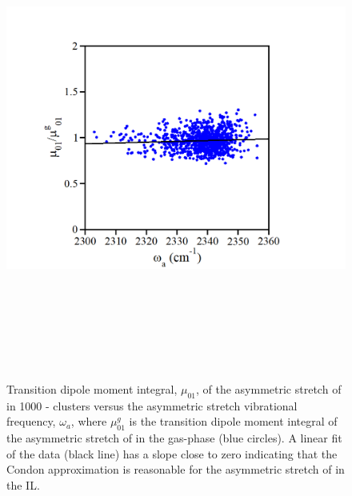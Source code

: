\documentclass[]{article}
\begin{document}
\begin{figure}
  \centering
  \includegraphics[width=6.49062in,height=6.25278in]{figure3.png}
  \caption{Transition dipole moment integral, \(\mu_{01}\), of the asymmetric stretch of  in 1000 -\ce{[C4C1im][PF6]} clusters versus the asymmetric stretch vibrational frequency, \(\omega_{a}\), where \(\mu_{01}^{g}\) is the transition dipole moment integral of the asymmetric stretch of  in the gas-phase (blue circles). A linear fit of the data (black line) has a slope close to zero indicating that the Condon approximation is reasonable for the asymmetric stretch of  in the \ce{[C4C1im][PF6]} IL.}
  \label{paper_03:fig3}
\end{figure}
\end{document}
